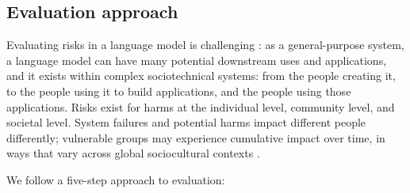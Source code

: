 \subsection{Evaluation approach}
\label{sec:rai-evaluation-approach}
Evaluating risks in a language model is challenging \citep{jacobs_wallach}: as a general-purpose system, a language model can have many potential downstream uses and applications, and it exists within complex sociotechnical systems: from the people creating it, to the people using it to build applications, and the people using those applications. Risks exist for harms at the individual level, community level, and societal level. System failures and potential harms impact different people differently; vulnerable groups may experience cumulative impact over time, in ways that vary across global sociocultural contexts \citep{shelby2023identifying}.

We follow a five-step approach to evaluation:

